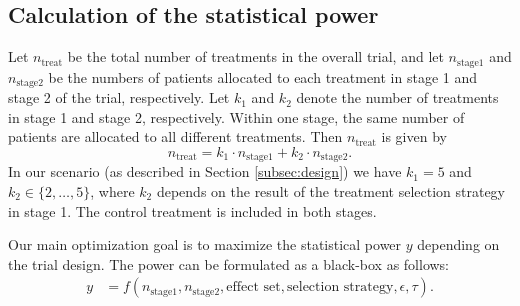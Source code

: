 \documentclass[bimj,fleqn]{w-art}
\theoremstyle{plain}
\theoremstyle{definition}
\begin{document}
\subsection{Calculation of the statistical power}

Let $n_{\text{treat}}$ be the total number of treatments in the overall trial, and let $n_{\text{stage1}}$ and $n_{\text{stage2}}$ be the numbers of patients allocated to each treatment in stage 1 and stage 2 of the trial, respectively. 
Let $k_1$ and $k_2$ denote the number of treatments in stage 1 and stage 2, respectively. 
Within one stage, the same number of patients are allocated to all different treatments. 
Then $n_{\text{treat}}$ is given by
\begin{equation}
  \label{eq:ntreat}
  n_{\text{treat}} = k_1 \cdot n_{\text{stage1}} + k_2 \cdot n_{\text{stage2}}.
\end{equation}
In our scenario (as described in Section \ref{subsec:design}) we have $k_1 = 5$ and $k_2 \in \{2, \ldots, 5\}$, where $k_2$ depends on the result of the treatment selection strategy in stage 1.
The control treatment is included in both stages.

Our main optimization goal is to maximize the statistical power $y$ depending on the trial design. 
The power can be formulated as a black-box as follows:
\begin{align}
  \label{eq:bbox}
  y & = f(n_{\text{stage1}}, n_{\text{stage2}}, \text{effect set}, \text{selection strategy}, \epsilon, \tau).
\end{align}
\end{document}
